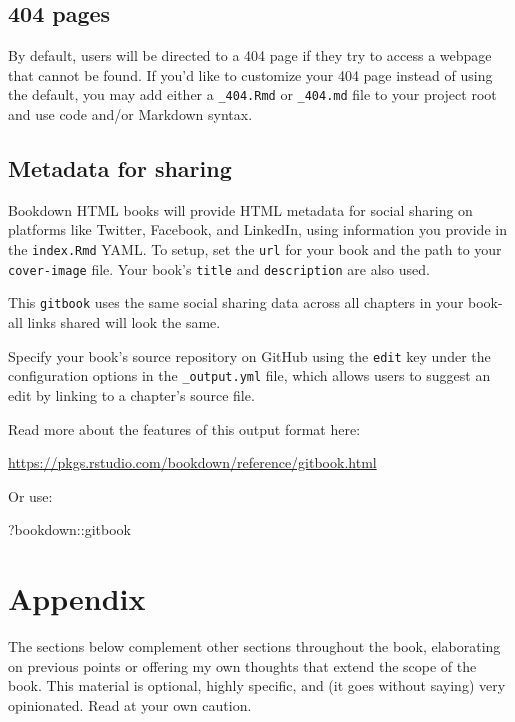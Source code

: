 \documentclass[
]{book}
\newenvironment{Shaded}{\begin{snugshade}}{\end{snugshade}}
\newcommand{\NormalTok}[1]{#1}
\newcommand{\SpecialCharTok}[1]{\textcolor[rgb]{0.00,0.00,0.00}{#1}}
\theoremstyle{definition}
\theoremstyle{definition}
\theoremstyle{definition}
\theoremstyle{definition}
\theoremstyle{remark}
\begin{document}
\hypertarget{pages}{%
\section{404 pages}\label{pages}}

By default, users will be directed to a 404 page if they try to access a webpage that cannot be found. If you'd like to customize your 404 page instead of using the default, you may add either a \texttt{\_404.Rmd} or \texttt{\_404.md} file to your project root and use code and/or Markdown syntax.

\hypertarget{metadata-for-sharing}{%
\section{Metadata for sharing}\label{metadata-for-sharing}}

Bookdown HTML books will provide HTML metadata for social sharing on platforms like Twitter, Facebook, and LinkedIn, using information you provide in the \texttt{index.Rmd} YAML. To setup, set the \texttt{url} for your book and the path to your \texttt{cover-image} file. Your book's \texttt{title} and \texttt{description} are also used.

This \texttt{gitbook} uses the same social sharing data across all chapters in your book- all links shared will look the same.

Specify your book's source repository on GitHub using the \texttt{edit} key under the configuration options in the \texttt{\_output.yml} file, which allows users to suggest an edit by linking to a chapter's source file.

Read more about the features of this output format here:

\url{https://pkgs.rstudio.com/bookdown/reference/gitbook.html}

Or use:

\begin{Shaded}
\begin{Highlighting}[]
\NormalTok{?bookdown}\SpecialCharTok{::}\NormalTok{gitbook}
\end{Highlighting}
\end{Shaded}

\hypertarget{appendix}{%
\chapter*{Appendix}\label{appendix}}

The sections below complement other sections throughout the book, elaborating
on previous points or offering my own thoughts that extend the scope of the
book. This material is optional, highly specific, and (it goes without saying)
very opinionated. Read at your own caution.
\end{document}
